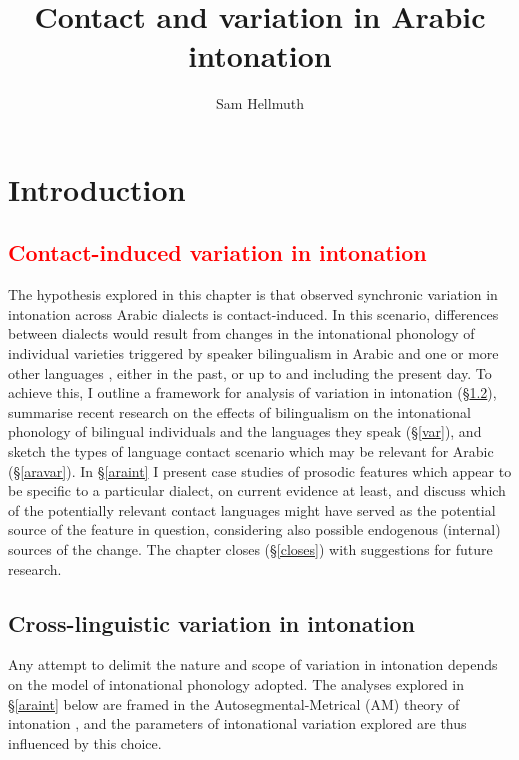 \documentclass[output=paper]{langsci/langscibook}
\author{Sam Hellmuth\affiliation{University of York}}
\title{Contact and variation in Arabic intonation}
\begin{document}
\maketitle 
 
 

 \section{Introduction}


 \subsection{\textcolor{red}{Contact-induced variation in intonation}}


The hypothesis explored in this chapter is that observed synchronic variation in intonation across Arabic dialects is contact-induced. In this scenario, differences between dialects would result from changes in the intonational phonology of individual varieties triggered by speaker bilingualism in Arabic and one or more other languages \citep{Lucas2015}, either in the past, or up to and including the present day. To achieve this, I outline a framework for analysis of variation in intonation (§\ref{cross}), summarise recent research on the effects of bilingualism on the intonational phonology of bilingual individuals and the languages they speak (§\ref{var}), and sketch the types of language contact scenario which may be relevant for Arabic (§\ref{aravar}). In §\ref{araint} I present case studies of prosodic features which appear to be specific to a particular dialect, on current evidence at least, and discuss which of the potentially relevant contact languages might have served as the potential source of the feature in question, considering also possible endogenous (internal) sources of the change. The chapter closes (§\ref{closes}) with suggestions for future research.


 
 \subsection{Cross-linguistic variation in intonation} \label{cross}


Any attempt to delimit the nature and scope of variation in intonation depends on the model of intonational phonology adopted. The analyses explored in §\ref{araint} below are framed in the Autosegmental-Metrical (AM) theory of intonation \citep{Ladd2008}, and the parameters of intonational variation explored are thus influenced by this choice. 
\end{document}
